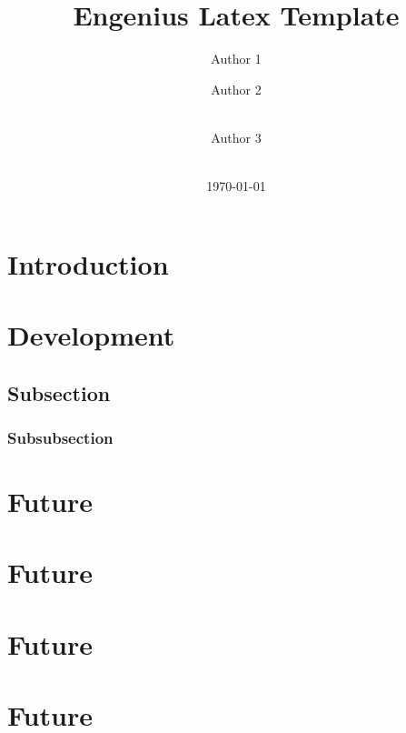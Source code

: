 \documentclass[]{engenius}
\title{Engenius Latex Template}
\author{Author 1 \\ \email{emailauthor1@ua.pt}
	\and Author 2 \\ \email{emailauthor2@ua.pt} \\ \depofepower
    \and Author 3 \\ \email{emailauthor3@ua.pt} \\ \depofbusinesscolor
    }
\date{\today}
\begin{document}
\maketitle

\begin{abstract}
\blindtext
\end{abstract}

\section{Introduction}
\blindtext

\section{Development}
\blindtext

\subsection{Subsection}
\blindtext

\subsubsection{Subsubsection}
\blindtext

\section{Future}
\blindtext

\section{Future}
\blindtext

\section{Future}
\blindtext

\section{Future}
\blindtext
\end{document}
